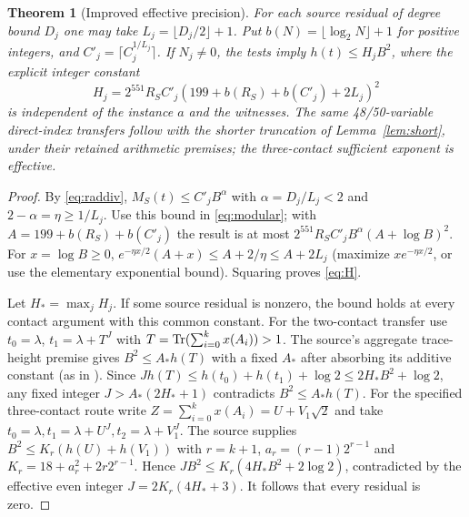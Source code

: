 \documentclass[11pt]{article}
\newtheorem{theorem}{Theorem}[section]
\begin{document}
\begin{theorem}[Improved effective precision]\label{thm:precision}
For each source residual of degree bound $D_j$ one may take
$L_j=\lfloor D_j/2\rfloor+1$. Put $b(N)=\lfloor\log_2 N\rfloor+1$
for positive integers, and $C'_j=\lceil C_j^{1/L_j}\rceil$.
If $N_j\ne0$, the tests imply $h(t)\le H_j B^2$, where the explicit
integer constant
\begin{equation}\label{eq:H}
 H_j=2^{551} R_S C'_j(199+b(R_S)+b(C'_j)+2L_j)^2
\end{equation}
is independent of the instance $a$ and the witnesses. The same
48/50-variable direct-index transfers follow with the shorter
truncation of Lemma~\ref{lem:short}, under their retained arithmetic
premises; the three-contact sufficient exponent is effective.
\end{theorem}
\begin{proof}
By \eqref{eq:raddiv}, $M_S(t)\le C'_j B^{\alpha}$ with
$\alpha=D_j/L_j<2$ and $2-\alpha=\eta\ge1/L_j$.
Use this bound in \eqref{eq:modular}; with
$A=199+b(R_S)+b(C'_j)$ the result is at most
$2^{551}R_SC'_j B^\alpha(A+\log B)^2$.
For $x=\log B\ge0$,
$e^{-\eta x/2}(A+x)\le A+2/\eta\le A+2L_j$ (maximize
$x e^{-\eta x/2}$, or use the elementary exponential bound).
Squaring proves \eqref{eq:H}.

Let $H_* = \max_j H_j$. If some source residual is nonzero, the bound
holds at every contact argument with this common constant. For the
two-contact transfer use $t_0=\lambda$, $t_1=\lambda+T^J$ with
$T=\operatorname{Tr}(\sum_{i=0}^k x(A_i))>1$. The source's aggregate trace-height
premise gives $B^2\le A_*h(T)$ with a fixed $A_*$ after absorbing its
additive constant (as in \cite{index}). Since
$J h(T)\le h(t_0)+h(t_1)+\log2\le 2H_*B^2+\log2$, any fixed integer
$J>A_*(2H_*+1)$ contradicts $B^2\le A_* h(T)$.
For the specified three-contact route write
$Z=\sum_{i=0}^k x(A_i)=U+V_1\sqrt2$ and take
$t_0=\lambda,t_1=\lambda+U^J,t_2=\lambda+V_1^J$.
The source supplies $B^2\le K_r(h(U)+h(V_1))$ with
$r=k+1$, $a_r=(r-1)2^{r-1}$ and $K_r=18+a_r^2+2r2^{r-1}$.
Hence $J B^2\le K_r(4H_* B^2+2\log2)$, contradicted by the effective
even integer $J=2K_r(4H_*+3)$. It follows that every residual is zero.


\end{proof}
\end{document}
